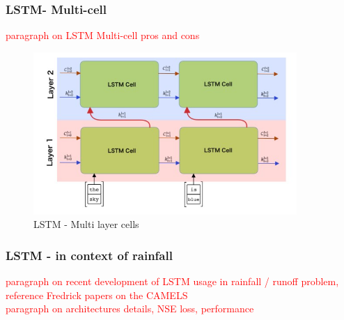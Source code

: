 \documentclass[12pt]{report}
\begin{document}
\subsubsection{LSTM- Multi-cell}
\textcolor{red}{paragraph on LSTM Multi-cell pros and cons}\\
\begin{figure}[H]\centering\includegraphics[width=10cm]{LSTM_MULTI.png}\caption{LSTM - Multi layer cells}\end{figure}
\subsubsection{LSTM - in context of rainfall}

\textcolor{red}{paragraph on recent development of LSTM usage in rainfall / runoff problem, reference Fredrick papers on the CAMELS}\\

\textcolor{red}{paragraph on architectures details, NSE loss, performance}\\
\end{document}
